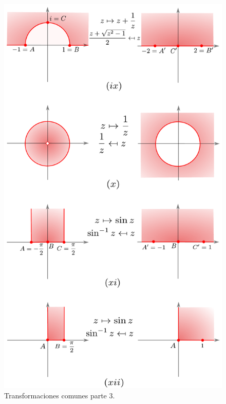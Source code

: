 \begin{figure}[H]
    \centering
    \includegraphics[scale = 0.7]{Figuras/MapeoConforme6.pdf}
    \caption{Transformaciones comunes parte 3.}
    \label{fig:EjMapeosConformes3}
\end{figure}





